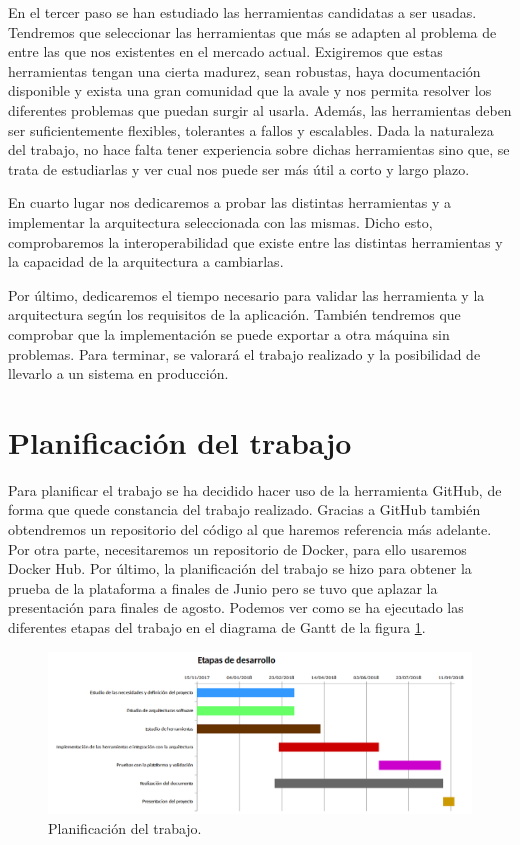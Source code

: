 En el tercer paso se han estudiado las herramientas candidatas a ser
usadas. Tendremos que seleccionar las herramientas que más se adapten
al problema de entre las que nos existentes en el mercado actual.
Exigiremos que estas herramientas tengan una cierta madurez, sean
robustas, haya documentación disponible y exista una gran comunidad
que la avale y nos permita resolver los diferentes problemas que
puedan surgir al usarla. Además, las herramientas deben ser
suficientemente flexibles, tolerantes a fallos y escalables. Dada la
naturaleza del trabajo, no hace falta tener experiencia sobre dichas
herramientas sino que, se trata de estudiarlas y ver cual nos puede
ser más útil a corto y largo plazo.

En cuarto lugar nos dedicaremos a probar las distintas herramientas y
a implementar la arquitectura seleccionada con las mismas. Dicho esto,
comprobaremos la interoperabilidad que existe entre las distintas
herramientas y la capacidad de la arquitectura a cambiarlas.


Por último, dedicaremos el tiempo necesario para validar las
herramienta y la arquitectura según los requisitos de la aplicación.
También tendremos que comprobar que la implementación se puede
exportar a otra máquina sin problemas. Para terminar, se valorará el
trabajo realizado y la posibilidad de llevarlo a un sistema en
producción.

\section{Planificación del trabajo\label{planificacion}}

Para planificar el trabajo se ha decidido hacer uso de la herramienta
GitHub, de forma que quede constancia del trabajo realizado. Gracias a
GitHub también obtendremos un repositorio del código al que haremos
referencia más adelante. Por otra parte, necesitaremos un repositorio
de Docker, para ello usaremos Docker Hub. Por último, la planificación
del trabajo se hizo para obtener la prueba de la plataforma a finales
de Junio pero se tuvo que aplazar la presentación para finales de
agosto. Podemos ver como se ha ejecutado las diferentes etapas del
trabajo en el diagrama de Gantt de la figura \ref{etapas}.

\begin{figure}[htp]
\centering
\includegraphics[scale=0.57]{Imagenes/Etapasv2.png}
\caption{Planificación del trabajo.}
\label{etapas}
\end{figure}




